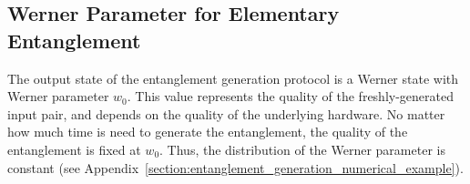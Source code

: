 \documentclass{masterthesis}
\begin{document}
\subsection{Werner Parameter for Elementary Entanglement}\label{subsection:werner_parameter_gen}

The output state of the entanglement generation protocol is a Werner state with Werner parameter $w_0$. This value represents the quality of the freshly-generated input pair, and depends on the quality of the underlying hardware.
No matter how much time is need to generate the entanglement, the quality of the entanglement is fixed at $w_0$. Thus, the distribution of the Werner parameter is constant (see Appendix~\ref{section:entanglement_generation_numerical_example}).




\end{document}
